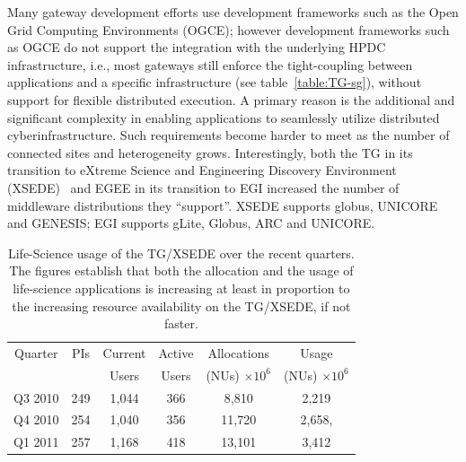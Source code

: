 \documentclass[]{svjour3}
\begin{document}
Many gateway development efforts use development
frameworks such as the Open Grid Computing
Environments\cite{ogce-2010} (OGCE); however development frameworks
such as OGCE do not support the integration with the underlying HPDC
infrastructure, i.e., most gateways still enforce the tight-coupling
between applications and a specific infrastructure (see
table~\ref{table:TG-sg}), without support for flexible distributed
execution.  A primary reason is the additional and significant
complexity in %
enabling applications to seamlessly utilize distributed
cyberinfrastructure. Such requirements become harder to meet as the
number of connected sites and heterogeneity grows. Interestingly, both
the TG in its transition to eXtreme Science and Engineering Discovery
Environment (XSEDE)~\cite{XSEDE} and EGEE in its transition to EGI
increased the number of middleware distributions they ``support''.
XSEDE supports globus, UNICORE and GENESIS; EGI supports gLite,
Globus, ARC and UNICORE.



\begin{table}
\centering
 \small
\begin{tabular}{|c|c|c|c|c|c|} 
  \hline  Quarter & PIs & Current & Active & Allocations  & Usage\\
  & & Users  &  Users & (NUs) $\times 10^6$& (NUs) $\times 10^6$ \\ \hline
  Q3 2010 & 249 & 1,044 & 366 & 8,810   & 2,219  \\ \hline
  Q4 2010 & 254 & 1,040 & 356 & 11,720  & 2,658, \\ \hline
  Q1 2011 & 257 & 1,168 & 418 & 13,101  & 3,412\\ \hline 
\end{tabular} 
\caption{Life-Science usage of the TG/XSEDE over the recent
  quarters. The figures establish that both the  allocation and the
  usage of life-science applications is increasing at least in
  proportion to the increasing resource availability on the TG/XSEDE,
  if not faster.}
 \label{tg2011} 
\end{table}




\end{document}
